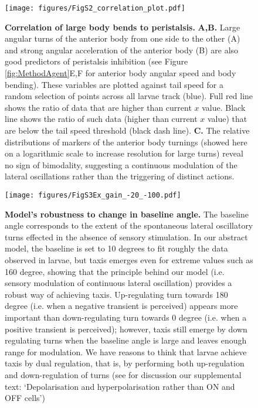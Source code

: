 \begin{figure}
\begin{center}
\texttt{[image: figures/FigS2\_correlation\_plot.pdf]}
\caption{{\bf Correlation of large body bends to peristalsis.}
 {\bf A,B.} Large angular turns of the anterior body from one side to the other (A) and strong angular acceleration of the anterior body (B) are also good predictors of peristalsis inhibition (see Figure \ref{fig:MethodAgent}E,F for anterior body angular speed and body bending). These variables are plotted against tail speed for a random selection of points across all larvae track (blue). Full red line shows the ratio of data that are higher than current $x$ value. Black line shows the ratio of such data (higher than current $x$ value) that are below the tail speed threshold (black dash line).
 {\bf C.} The relative distributions of markers of the anterior body turnings (showed here on a logarithmic scale to increase resolution for large turns) reveal no sign of bimodality, suggesting a continuous modulation of the lateral oscillations rather than the triggering of distinct actions.
\label{fig:FigS3}}
\end{center}
\end{figure}


\begin{figure}
\begin{center}
\texttt{[image: figures/FigS3Ex\_gain\_-20\_-100.pdf]}
\caption{{\bf Model’s robustness to change in baseline angle.}
The baseline angle corresponds to the extent of the spontaneous lateral oscillatory turns effected in the absence of sensory stimulation. In our abstract model, the baseline is set to 10 degrees to fit roughly the data observed in larvae, but taxis emerges even for extreme values such as 160 degree, showing that the principle behind our model (i.e. sensory modulation of continuous lateral oscillation) provides a robust way of achieving taxis. Up-regulating turn towards 180 degree (i.e. when a negative transient is perceived) appears more important than down-regulating turn towards 0 degree (i.e. when a positive transient is perceived); however, taxis still emerge by down regulating turns when the baseline angle is large and leaves enough range for modulation. We have reasons to think that larvae achieve taxis by dual regulation, that is, by performing both up-regulation and down-regulation of turns (see for discussion our supplemental text: ‘Depolarisation and hyperpolarisation rather than ON and OFF cells’)   
\label{fig:FigS1}}
\end{center}
\end{figure}

